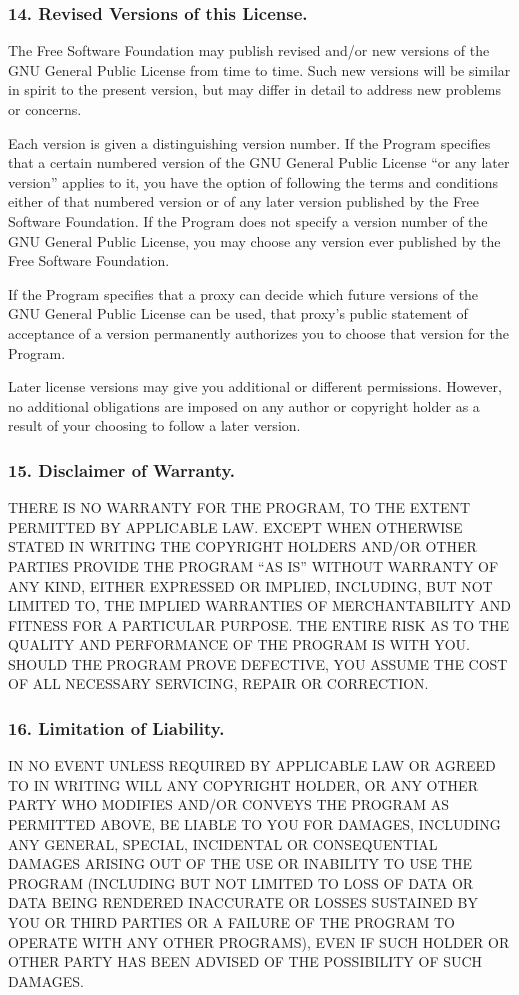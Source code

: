 \subsubsection{14. Revised Versions of this License.}
The Free Software Foundation may publish revised and/or new versions of the GNU General Public License from time to time. Such new versions will be similar in spirit to the present version, but may differ in detail to address new problems or concerns.\par
Each version is given a distinguishing version number. If the Program specifies that a certain numbered version of the GNU General Public License “or any later version” applies to it, you have the option of following the terms and conditions either of that numbered version or of any later version published by the Free Software Foundation. If the Program does not specify a version number of the GNU General Public License, you may choose any version ever published by the Free Software Foundation.\par
If the Program specifies that a proxy can decide which future versions of the GNU General Public License can be used, that proxy's public statement of acceptance of a version permanently authorizes you to choose that version for the Program.\par
Later license versions may give you additional or different permissions. However, no additional obligations are imposed on any author or copyright holder as a result of your choosing to follow a later version.
\subsubsection{15. Disclaimer of Warranty.}
THERE IS NO WARRANTY FOR THE PROGRAM, TO THE EXTENT PERMITTED BY APPLICABLE LAW. EXCEPT WHEN OTHERWISE STATED IN WRITING THE COPYRIGHT HOLDERS AND/OR OTHER PARTIES PROVIDE THE PROGRAM “AS IS” WITHOUT WARRANTY OF ANY KIND, EITHER EXPRESSED OR IMPLIED, INCLUDING, BUT NOT LIMITED TO, THE IMPLIED WARRANTIES OF MERCHANTABILITY AND FITNESS FOR A PARTICULAR PURPOSE. THE ENTIRE RISK AS TO THE QUALITY AND PERFORMANCE OF THE PROGRAM IS WITH YOU. SHOULD THE PROGRAM PROVE DEFECTIVE, YOU ASSUME THE COST OF ALL NECESSARY SERVICING, REPAIR OR CORRECTION.
\subsubsection{16. Limitation of Liability.}
IN NO EVENT UNLESS REQUIRED BY APPLICABLE LAW OR AGREED TO IN WRITING WILL ANY COPYRIGHT HOLDER, OR ANY OTHER PARTY WHO MODIFIES AND/OR CONVEYS THE PROGRAM AS PERMITTED ABOVE, BE LIABLE TO YOU FOR DAMAGES, INCLUDING ANY GENERAL, SPECIAL, INCIDENTAL OR CONSEQUENTIAL DAMAGES ARISING OUT OF THE USE OR INABILITY TO USE THE PROGRAM (INCLUDING BUT NOT LIMITED TO LOSS OF DATA OR DATA BEING RENDERED INACCURATE OR LOSSES SUSTAINED BY YOU OR THIRD PARTIES OR A FAILURE OF THE PROGRAM TO OPERATE WITH ANY OTHER PROGRAMS), EVEN IF SUCH HOLDER OR OTHER PARTY HAS BEEN ADVISED OF THE POSSIBILITY OF SUCH DAMAGES.
